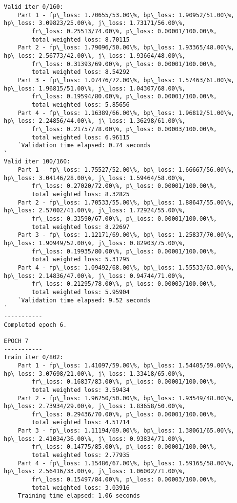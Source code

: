 \documentclass[11pt]{article}
\begin{document}
\begin{Verbatim}[commandchars=\\\{\}]
Valid iter 0/160:
	Part 1 - fp\_loss: 1.70655/53.00\%, bp\_loss: 1.90952/51.00\%, hp\_loss: 3.09823/25.00\%, j\_loss: 1.73171/56.00\%, 
		fr\_loss: 0.25513/74.00\%, p\_loss: 0.00001/100.00\%, 
		total weighted loss: 8.70115
	Part 2 - fp\_loss: 1.79096/50.00\%, bp\_loss: 1.93365/48.00\%, hp\_loss: 2.56773/42.00\%, j\_loss: 1.93664/48.00\%, 
		fr\_loss: 0.31393/69.00\%, p\_loss: 0.00001/100.00\%, 
		total weighted loss: 8.54292
	Part 3 - fp\_loss: 1.07476/72.00\%, bp\_loss: 1.57463/61.00\%, hp\_loss: 1.96815/51.00\%, j\_loss: 1.04307/68.00\%, 
		fr\_loss: 0.19594/80.00\%, p\_loss: 0.00001/100.00\%, 
		total weighted loss: 5.85656
	Part 4 - fp\_loss: 1.16389/66.00\%, bp\_loss: 1.96812/51.00\%, hp\_loss: 2.24856/44.00\%, j\_loss: 1.36298/61.00\%, 
		fr\_loss: 0.21757/78.00\%, p\_loss: 0.00003/100.00\%, 
		total weighted loss: 6.96115
	`Validation time elapsed: 0.74 seconds
`
Valid iter 100/160:
	Part 1 - fp\_loss: 1.75527/52.00\%, bp\_loss: 1.66667/56.00\%, hp\_loss: 3.04146/28.00\%, j\_loss: 1.59464/58.00\%, 
		fr\_loss: 0.27020/72.00\%, p\_loss: 0.00001/100.00\%, 
		total weighted loss: 8.32825
	Part 2 - fp\_loss: 1.70533/55.00\%, bp\_loss: 1.88647/55.00\%, hp\_loss: 2.57002/41.00\%, j\_loss: 1.72924/55.00\%, 
		fr\_loss: 0.33590/67.00\%, p\_loss: 0.00001/100.00\%, 
		total weighted loss: 8.22697
	Part 3 - fp\_loss: 1.12171/69.00\%, bp\_loss: 1.25837/70.00\%, hp\_loss: 1.90949/52.00\%, j\_loss: 0.82903/75.00\%, 
		fr\_loss: 0.19935/80.00\%, p\_loss: 0.00001/100.00\%, 
		total weighted loss: 5.31795
	Part 4 - fp\_loss: 1.09492/68.00\%, bp\_loss: 1.55533/63.00\%, hp\_loss: 2.14836/47.00\%, j\_loss: 0.94744/71.00\%, 
		fr\_loss: 0.21295/78.00\%, p\_loss: 0.00003/100.00\%, 
		total weighted loss: 5.95904
	`Validation time elapsed: 9.52 seconds
`
-----------
Completed epoch 6.

EPOCH 7
-----------
Train iter 0/802:
	Part 1 - fp\_loss: 1.41097/59.00\%, bp\_loss: 1.54405/59.00\%, hp\_loss: 3.07698/21.00\%, j\_loss: 1.33418/65.00\%, 
		fr\_loss: 0.16837/83.00\%, p\_loss: 0.00001/100.00\%, 
		total weighted loss: 3.59434
	Part 2 - fp\_loss: 1.96750/50.00\%, bp\_loss: 1.93549/48.00\%, hp\_loss: 2.73934/29.00\%, j\_loss: 1.83658/50.00\%, 
		fr\_loss: 0.29436/70.00\%, p\_loss: 0.00001/100.00\%, 
		total weighted loss: 4.51714
	Part 3 - fp\_loss: 1.11194/69.00\%, bp\_loss: 1.38061/65.00\%, hp\_loss: 2.41034/36.00\%, j\_loss: 0.93834/71.00\%, 
		fr\_loss: 0.14775/85.00\%, p\_loss: 0.00001/100.00\%, 
		total weighted loss: 2.77935
	Part 4 - fp\_loss: 1.15486/67.00\%, bp\_loss: 1.59165/58.00\%, hp\_loss: 2.56416/33.00\%, j\_loss: 1.06002/71.00\%, 
		fr\_loss: 0.15497/84.00\%, p\_loss: 0.00003/100.00\%, 
		total weighted loss: 3.03916
	Training time elapsed: 1.06 seconds


\end{Verbatim}
\end{document}
